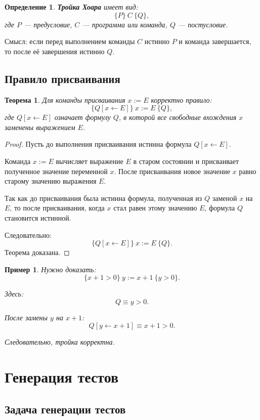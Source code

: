 \documentclass[12pt,a4paper]{article}
\newtheorem{definition}{Определение}
\newtheorem{theorem}{Теорема}
\newtheorem{example}{Пример}
\begin{document}
\begin{definition}
\textbf{Тройка Хоара} имеет вид:
\[
\{P\}\ C\ \{Q\},
\]
где $P$ --- предусловие, $C$ --- программа или команда, $Q$ --- постусловие.
\end{definition}

Смысл:
если перед выполнением команды $C$ истинно $P$ и команда завершается, то после её завершения истинно $Q$.

\subsection{Правило присваивания}

\begin{theorem}
Для команды присваивания $x := E$ корректно правило:
\[
\{Q[x \leftarrow E]\}\ x := E\ \{Q\},
\]
где $Q[x \leftarrow E]$ означает формулу $Q$, в которой все свободные вхождения $x$ заменены выражением $E$.
\end{theorem}

\begin{proof}
Пусть до выполнения присваивания истинна формула $Q[x \leftarrow E]$.

Команда $x := E$ вычисляет выражение $E$ в старом состоянии и присваивает полученное значение переменной $x$. После присваивания новое значение $x$ равно старому значению выражения $E$.

Так как до присваивания была истинна формула, полученная из $Q$ заменой $x$ на $E$, то после присваивания, когда $x$ стал равен этому значению $E$, формула $Q$ становится истинной.

Следовательно:
\[
\{Q[x \leftarrow E]\}\ x := E\ \{Q\}.
\]
Теорема доказана.
\end{proof}

\begin{example}
Нужно доказать:
\[
\{x+1>0\}\ y:=x+1\ \{y>0\}.
\]

Здесь:
\[
Q \equiv y>0.
\]

После замены $y$ на $x+1$:
\[
Q[y \leftarrow x+1] \equiv x+1>0.
\]

Следовательно, тройка корректна.
\end{example}

\section{Генерация тестов}

\subsection{Задача генерации тестов}
\end{document}
